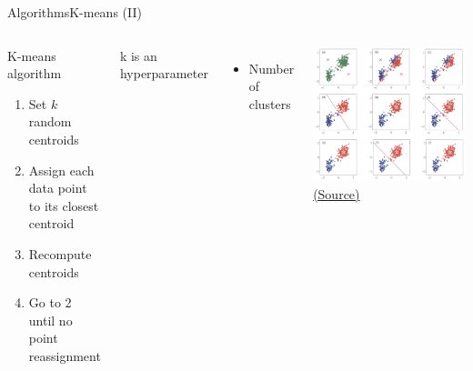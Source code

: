 \documentclass[10pt,compress]{beamer} %
\begin{document}
\begin{frame}{Algorithms}{K-means (II)}
    \begin{columns}
       \begin{block}{K-means algorithm}
       \begin{enumerate}
        \item Set $k$ random centroids
        \item Assign each data point to its closest centroid
        \item Recompute centroids
        \item Go to 2 until no point reassignment
       \end{enumerate}
       \end{block}

       k is an hyperparameter
       \begin{itemize}
        \item Number of clusters
       \end{itemize}

		\includegraphics[width=\textwidth]{figs/kmeans.jpeg}\\

    \centering \tiny{\href{https://dendroid.sk/2011/05/09/k-means-clustering/}{(Source)}}
    \end{columns}

\end{frame}
\end{document}
